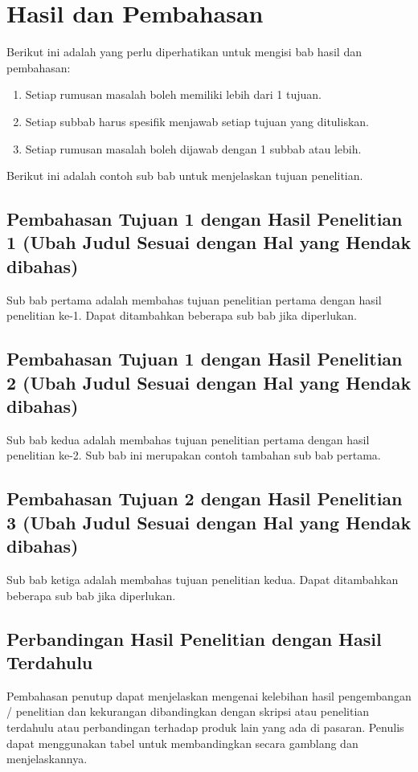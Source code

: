 \chapter{Hasil dan Pembahasan}

Berikut ini adalah yang perlu diperhatikan untuk mengisi bab hasil dan pembahasan:

\begin{enumerate}
	\item Setiap rumusan masalah boleh memiliki lebih dari 1 tujuan.
	\item Setiap subbab harus spesifik menjawab setiap tujuan yang dituliskan.
	\item Setiap rumusan masalah boleh dijawab dengan 1 subbab atau lebih.
\end{enumerate}

Berikut ini adalah contoh sub bab untuk menjelaskan tujuan penelitian.

\section{Pembahasan Tujuan 1 dengan Hasil Penelitian 1 (Ubah Judul Sesuai dengan Hal yang Hendak dibahas)}

Sub bab pertama adalah membahas tujuan penelitian pertama dengan hasil penelitian ke-1. 
Dapat ditambahkan beberapa sub bab jika diperlukan.

\section{Pembahasan Tujuan 1 dengan Hasil Penelitian 2 (Ubah Judul Sesuai dengan Hal yang Hendak dibahas)}

Sub bab kedua adalah membahas tujuan penelitian pertama dengan hasil penelitian ke-2. Sub bab ini merupakan contoh tambahan sub bab pertama.

\section{Pembahasan Tujuan 2 dengan Hasil Penelitian 3 (Ubah Judul Sesuai dengan Hal yang Hendak dibahas)}

Sub bab ketiga adalah membahas tujuan penelitian kedua. Dapat ditambahkan beberapa sub bab jika diperlukan.

\section{Perbandingan Hasil Penelitian dengan Hasil Terdahulu}

Pembahasan penutup dapat menjelaskan mengenai kelebihan hasil pengembangan / 
penelitian dan kekurangan dibandingkan dengan skripsi atau penelitian terdahulu atau
perbandingan terhadap produk lain yang ada di pasaran. Penulis dapat menggunakan tabel untuk membandingkan secara gamblang dan menjelaskannya.